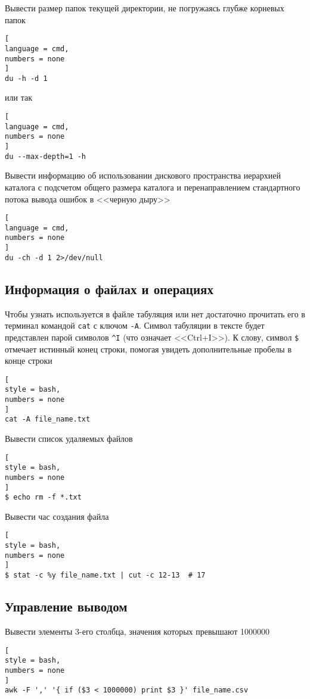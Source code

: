 \documentclass[%
	11pt,
	a4paper,
	utf8,
		]{article}
\begin{document}
Вывести размер папок текущей директории, не погружаясь глубже корневых папок
\begin{lstlisting}[
language = cmd,
numbers = none
]
du -h -d 1
\end{lstlisting}
или так
\begin{lstlisting}[
language = cmd,
numbers = none
]
du --max-depth=1 -h
\end{lstlisting}

Вывести информацию об использовании дискового пространства иерархией каталога с подсчетом общего размера каталога и перенаправлением стандартного потока вывода ошибок в <<черную дыру>>
\begin{lstlisting}[
language = cmd,
numbers = none
]
du -ch -d 1 2>/dev/null
\end{lstlisting}

\subsection{Информация о файлах и операциях}

Чтобы узнать используется в файле табуляция или нет достаточно прочитать его в терминал командой \texttt{cat} с ключом \verb|-A|. Символ табуляции в тексте будет представлен парой символов \verb|^I| (что означает <<Ctrl+I>>). К слову, символ \verb|$| отмечает истинный конец строки, помогая увидеть дополнительные пробелы в конце строки
\begin{lstlisting}[
style = bash,
numbers = none
]
cat -A file_name.txt
\end{lstlisting}

Вывести список удаляемых файлов
\begin{lstlisting}[
style = bash,
numbers = none
]
$ echo rm -f *.txt
\end{lstlisting}

Вывести час создания файла
\begin{lstlisting}[
style = bash,
numbers = none
]
$ stat -c %y file_name.txt | cut -c 12-13  # 17
\end{lstlisting}

\subsection{Управление выводом}

Вывести элементы 3-его столбца, значения которых превышают 1000000
\begin{lstlisting}[
style = bash,
numbers = none
]
awk -F ',' '{ if ($3 < 1000000) print $3 }' file_name.csv
\end{lstlisting}
\end{document}
